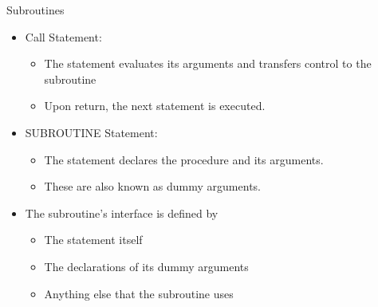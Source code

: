 \documentclass[10pt,t]{beamer}
\begin{document}
\begin{frame}{Subroutines}
  \begin{itemize}
    \item Call Statement: 
      \begin{itemize}
        \item The  statement evaluates its arguments and transfers control to the subroutine\\
        \item Upon return, the next statement is executed.
      \end{itemize}
    \item SUBROUTINE Statement:
      \begin{itemize}
        \item The  statement declares the procedure and its arguments.\\
        \item These are also known as dummy arguments.
      \end{itemize}
    \item The subroutine's interface is defined by
      \begin{itemize}
        \item The  statement itself
        \item The declarations of its dummy arguments
        \item Anything else that the subroutine uses
      \end{itemize}
   \end{itemize}

\end{frame}
\end{document}
